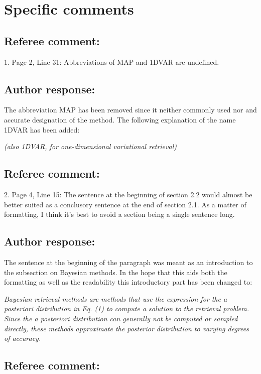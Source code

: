 \documentclass[journal abbreviation, manuscript]{copernicus}
\begin{document}
\section{Specific comments}

\subsection*{Referee comment:}

1. Page 2, Line 31: Abbreviations of MAP and 1DVAR are undefined.

\subsection*{Author response:}

The abbreviation MAP has been removed since it neither commonly used nor
and accurate designation of the method. The following explanation of the
name 1DVAR has been added:

\vspace{0.5em}
\textit{(also 1DVAR, for one-dimensional variational retrieval)}

\subsection*{Referee comment:}
2. Page 4, Line 15: The sentence at the beginning of section 2.2 would almost be better
suited as a conclusory sentence at the end of section 2.1. As a matter of formatting, I
think it’s best to avoid a section being a single sentence long.

\subsection*{Author response:}

The sentence at the beginning of the paragraph was meant as an introduction to the
subsection on Bayesian methods. In the hope that this aids both the formatting as
well as the readability this introductory part has been changed to:


\vspace{1em}
\textit{
Bayesian retrieval methods are methods that use the expression for the a
posteriori distribution in Eq. (1) to compute a solution to the
retrieval problem. Since the a posteriori distribution can generally not be
computed or sampled directly, these methods approximate the posterior
distribution to varying degrees of accuracy.}

\subsection*{Referee comment:}
\end{document}
